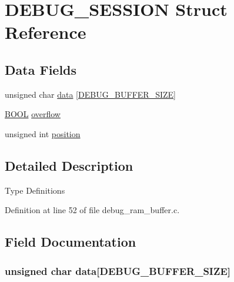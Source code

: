 \hypertarget{struct_d_e_b_u_g___s_e_s_s_i_o_n}{}\section{D\+E\+B\+U\+G\+\_\+\+S\+E\+S\+S\+I\+O\+N Struct Reference}
\label{struct_d_e_b_u_g___s_e_s_s_i_o_n}
\subsection*{Data Fields}
\begin{DoxyCompactItemize}
\item 
unsigned char \hyperlink{struct_d_e_b_u_g___s_e_s_s_i_o_n_a6fc446bc5b7d4ee6a69a04d6e201ac4a}{data} \mbox{[}\hyperlink{debug__ram__buffer_8c_ae62ff9427e273ff6b4e56bf2c29af019}{D\+E\+B\+U\+G\+\_\+\+B\+U\+F\+F\+E\+R\+\_\+\+S\+I\+Z\+E}\mbox{]}
\item 
\hyperlink{_generic_type_defs_8h_a54d65c7fa62e62c9754371e42f5111b9}{B\+O\+O\+L} \hyperlink{struct_d_e_b_u_g___s_e_s_s_i_o_n_abc7578797f4d3fd99d662d13d11d037f}{overflow}
\item 
unsigned int \hyperlink{struct_d_e_b_u_g___s_e_s_s_i_o_n_a1d7b72031fa39d396d531503904f337b}{position}
\end{DoxyCompactItemize}


\subsection{Detailed Description}
Type Definitions 

Definition at line 52 of file debug\+\_\+ram\+\_\+buffer.\+c.



\subsection{Field Documentation}
\hypertarget{struct_d_e_b_u_g___s_e_s_s_i_o_n_a6fc446bc5b7d4ee6a69a04d6e201ac4a}{}
\subsubsection[{data}]{\setlength{\rightskip}{0pt plus 5cm}unsigned char data\mbox{[}{\bf D\+E\+B\+U\+G\+\_\+\+B\+U\+F\+F\+E\+R\+\_\+\+S\+I\+Z\+E}\mbox{]}}\label{struct_d_e_b_u_g___s_e_s_s_i_o_n_a6fc446bc5b7d4ee6a69a04d6e201ac4a}


